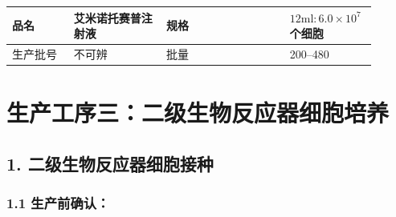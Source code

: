 \documentclass[UTF8,10pt,a4paper,fontset=fandol]{ctexart}
\newcommand{\fieldvalue}[1]{#1}
\newcommand{\handwritten}[1]{#1}
\begin{document}
\noindent
\begin{tabular}{|p{0.16\linewidth}|p{0.24\linewidth}|p{0.32\linewidth}|p{0.18\linewidth}|}
\hline
品名 & 艾米诺托赛普注射液 & 规格 & $12\mathrm{ml}:6.0\times10^{7}$个细胞 \\
\hline
生产批号 &
\fieldvalue{\handwritten{不可辨}} &
批量 & 200--480 \\
\hline
\end{tabular}

\section*{生产工序三：二级生物反应器细胞培养}

\subsection*{1. 二级生物反应器细胞接种}

\subsubsection*{1.1 生产前确认：}
\end{document}
